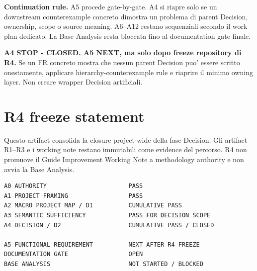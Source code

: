 \documentclass[11pt,a4paper]{article}
\begin{document}
\textbf{Continuation rule.} A5 procede gate-by-gate. A4 si riapre solo se un downstream counterexample concreto dimostra un problema di parent Decision, ownership, scope o source meaning. A6--A12 restano sequenziali secondo il work plan dedicato. La Base Analysis resta bloccata fino al documentation gate finale.

\begin{ddtaopen}[title={R4 STOP / NEXT}]
\textbf{A4 STOP - CLOSED. A5 NEXT, ma solo dopo freeze repository di R4.} Se un FR concreto mostra che nessun parent Decision puo' essere scritto onestamente, applicare hierarchy-counterexample rule e riaprire il minimo owning layer. Non creare wrapper Decision artificiali.
\end{ddtaopen}

\section{R4 freeze statement}
Questo artifact consolida la closure project-wide della fase Decision. Gli artifact R1--R3 e i working note restano immutabili come evidence del percorso. R4 non promuove il Guide Improvement Working Note a methodology authority e non avvia la Base Analysis.

\begin{ddtacore}[title={Freeze candidate}]
\begin{lstlisting}
A0 AUTHORITY                       PASS
A1 PROJECT FRAMING                 PASS
A2 MACRO PROJECT MAP / D1          CUMULATIVE PASS
A3 SEMANTIC SUFFICIENCY            PASS FOR DECISION SCOPE
A4 DECISION / D2                   CUMULATIVE PASS / CLOSED

A5 FUNCTIONAL REQUIREMENT          NEXT AFTER R4 FREEZE
DOCUMENTATION GATE                 OPEN
BASE ANALYSIS                      NOT STARTED / BLOCKED
\end{lstlisting}
\end{ddtacore}
\end{document}
